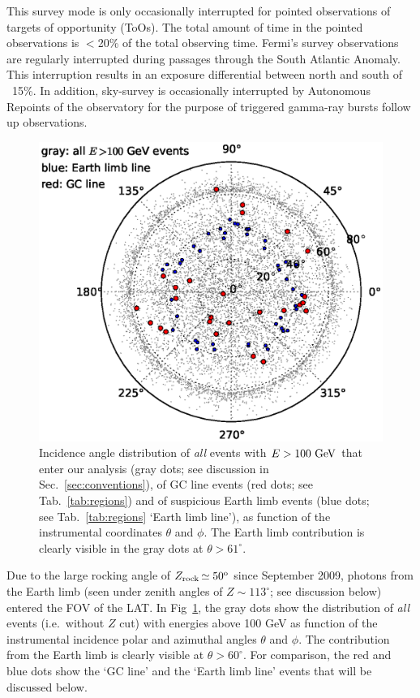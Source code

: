 \documentclass[aps,twocolumn,prd,superscriptaddress,showpacs,nofootinbib,fixfloat]{revtex4}
\newcommand{\GeV}{{\rm ~GeV}}
\newcommand{\degree}{^{\rm o}}
\newcommand{\zrock}{$Z_{\rm rock}$}
\begin{document}
This survey mode is only occasionally interrupted for
pointed observations of targets of opportunity (ToOs). The
total amount of time in the pointed observations is $<$20\%
of the total observing time. Fermi's survey observations are
regularly interrupted during passages through the South
Atlantic Anomaly. This interruption results in an exposure
differential between north and south of ~15\%. In addition,
sky-survey is occasionally interrupted by Autonomous
Repoints of the observatory for the purpose of triggered
gamma-ray bursts follow up observations.  \medskip

\begin{figure}[h]
  \begin{center}
    \includegraphics[width=0.9\linewidth]{plots/polarCounts.eps}
    \vspace{-0.5cm}
  \end{center}
  \caption{Incidence angle distribution of \emph{all} events
  with $E>100\GeV$ that enter our analysis (gray dots; see
  discussion in Sec.~\ref{sec:conventions}), of GC line
  events (red dots; see Tab.~\ref{tab:regions}) and of
  suspicious Earth limb events (blue dots; see
  Tab.~\ref{tab:regions} `Earth limb line'), as function of
  the instrumental coordinates $\theta$ and $\phi$. The
  Earth limb contribution is clearly visible in the gray
  dots at $\theta > 61^\circ$.}
  \label{fig:phiThetaDist}
\end{figure}

Due to the large rocking angle of \zrock$\simeq50\degree$
since September 2009, photons from the Earth limb (seen
under zenith angles of $Z\sim113^\circ$; see discussion
below) entered the FOV of the LAT. In
Fig~\ref{fig:phiThetaDist}, the gray dots show the
distribution of \emph{all} events (i.e.~without $Z$ cut)
with energies above 100 GeV as function of the instrumental
incidence polar and azimuthal angles $\theta$ and $\phi$.
The contribution from the Earth limb is clearly visible at
$\theta>60^\circ$. For comparison, the red and blue dots
show the `GC line' and the `Earth limb line' events that
will be discussed below.
\end{document}
